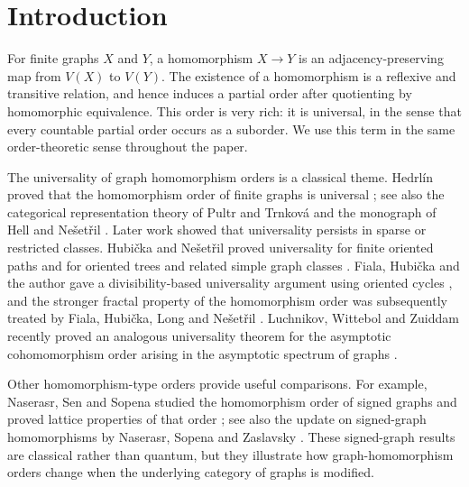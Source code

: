 \documentclass[11pt]{amsart}
\theoremstyle{plain}
\theoremstyle{definition}
\begin{document}
\maketitle

\section{Introduction}

For finite graphs $X$ and $Y$, a homomorphism $X\to Y$ is an adjacency-preserving map from $V(X)$ to $V(Y)$.  The existence of a homomorphism is a reflexive and transitive relation, and hence induces a partial order after quotienting by homomorphic equivalence.  This order is very rich: it is universal, in the sense that every countable partial order occurs as a suborder.  We use this term in the same order-theoretic sense throughout the paper.

The universality of graph homomorphism orders is a classical theme.  Hedrl\'{i}n proved that the homomorphism order of finite graphs is universal \cite{HedrlinUniversal}; see also the categorical representation theory of Pultr and Trnkov\'{a} \cite{PultrTrnkovaBook} and the monograph of Hell and Ne\v{s}et\v{r}il \cite{HellNesetril}.  Later work showed that universality persists in sparse or restricted classes.  Hubi\v{c}ka and Ne\v{s}et\v{r}il proved universality for finite oriented paths and for oriented trees and related simple graph classes \cite{HubickaNesetrilPaths,HubickaNesetrilTrees}.  Fiala, Hubi\v{c}ka and the author gave a divisibility-based universality argument using oriented cycles \cite{FialaHubickaLong}, and the stronger fractal property of the homomorphism order was subsequently treated by Fiala, Hubi\v{c}ka, Long and Ne\v{s}et\v{r}il \cite{FialaHubickaLongNesetril}.  Luchnikov, Wittebol and Zuiddam recently proved an analogous universality theorem for the asymptotic cohomomorphism order arising in the asymptotic spectrum of graphs \cite{LuchnikovWittebolZuiddam}.

Other homomorphism-type orders provide useful comparisons.  For example, Naserasr, Sen and Sopena studied the homomorphism order of signed graphs and proved lattice properties of that order \cite{NaserasrSenSopenaSignedOrder}; see also the update on signed-graph homomorphisms by Naserasr, Sopena and Zaslavsky \cite{NaserasrSopenaZaslavskySignedUpdate}.  These signed-graph results are classical rather than quantum, but they illustrate how graph-homomorphism orders change when the underlying category of graphs is modified.
\end{document}
